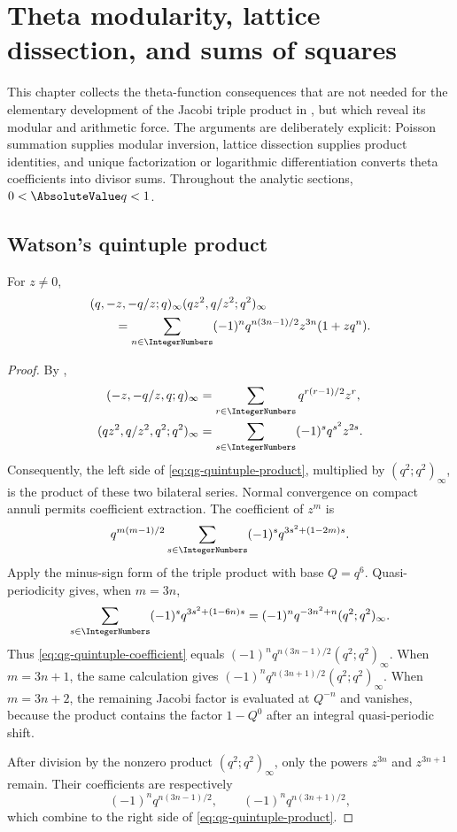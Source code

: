 \chapter{Theta modularity, lattice dissection, and sums of squares}
\label{chap:theta-modularity-squares}

This chapter collects the theta-function consequences that are not needed for
the elementary development of the Jacobi triple product in
, but which reveal its modular and arithmetic force.  The
arguments are deliberately explicit: Poisson summation supplies modular
inversion, lattice dissection supplies product identities, and unique
factorization or logarithmic differentiation converts theta coefficients into
divisor sums.  Throughout the analytic sections, $0<\AbsoluteValue q<1$.

\section{Watson's quintuple product}

\begin{theorem}
\label{qg:thm-quintuple-product}
For $z\ne0$,
\begin{align}
 &(q,-z,-q/z;q)_\infty(qz^2,q/z^2;q^2)_\infty\notag\\
 &\qquad=\sum_{n\in\IntegerNumbers}(-1)^n
 q^{n(3n-1)/2}z^{3n}(1+zq^n).
\label{eq:qg-quintuple-product}
\end{align}
\end{theorem}

\begin{proof}
By ,
\begin{align*}
 (-z,-q/z,q;q)_\infty
   &=\sum_{r\in\IntegerNumbers}q^{r(r-1)/2}z^r,\\
 (qz^2,q/z^2,q^2;q^2)_\infty
   &=\sum_{s\in\IntegerNumbers}(-1)^sq^{s^2}z^{2s}.
\end{align*}
Consequently, the left side of
\eqref{eq:qg-quintuple-product}, multiplied by $(q^2;q^2)_\infty$, is
the product of these two bilateral series.  Normal convergence on compact
annuli permits coefficient extraction.  The coefficient of $z^m$ is
\begin{equation}
 q^{m(m-1)/2}\sum_{s\in\IntegerNumbers}(-1)^s
 q^{3s^2+(1-2m)s}.
\label{eq:qg-quintuple-coefficient}
\end{equation}
Apply the minus-sign form of the triple product with base $Q=q^6$.
Quasi-periodicity gives, when $m=3n$,
\[
 \sum_{s\in\IntegerNumbers}(-1)^sq^{3s^2+(1-6n)s}
 =(-1)^nq^{-3n^2+n}(q^2;q^2)_\infty.
\]
Thus \eqref{eq:qg-quintuple-coefficient} equals
$(-1)^nq^{n(3n-1)/2}(q^2;q^2)_\infty$.  When $m=3n+1$, the same
calculation gives
$(-1)^nq^{n(3n+1)/2}(q^2;q^2)_\infty$.  When $m=3n+2$, the remaining
Jacobi factor is evaluated at $Q^{-n}$ and vanishes, because the product
contains the factor $1-Q^0$ after an integral quasi-periodic shift.

After division by the nonzero product $(q^2;q^2)_\infty$, only the powers
$z^{3n}$ and $z^{3n+1}$ remain.  Their coefficients are respectively
\[
 (-1)^nq^{n(3n-1)/2},
 \qquad
 (-1)^nq^{n(3n+1)/2},
\]
which combine to the right side of
\eqref{eq:qg-quintuple-product}.
\end{proof}

